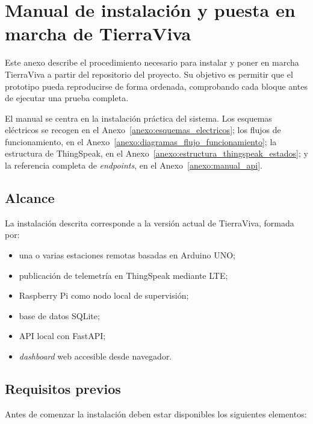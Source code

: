 \chapter{Manual de instalación y puesta en marcha de TierraViva}
\label{anexo:manual_instalacion_sistema}

Este anexo describe el procedimiento necesario para instalar y poner en marcha TierraViva a partir del repositorio del proyecto. Su objetivo es permitir que el prototipo pueda reproducirse de forma ordenada, comprobando cada bloque antes de ejecutar una prueba completa.

El manual se centra en la instalación práctica del sistema. Los esquemas eléctricos se recogen en el Anexo~\ref{anexo:esquemas_electricos}; los flujos de funcionamiento, en el Anexo~\ref{anexo:diagramas_flujo_funcionamiento}; la estructura de ThingSpeak, en el Anexo~\ref{anexo:estructura_thingspeak_estados}; y la referencia completa de \textit{endpoints}, en el Anexo~\ref{anexo:manual_api}.

\section{Alcance}

La instalación descrita corresponde a la versión actual de TierraViva, formada por:

\begin{itemize}
    \item una o varias estaciones remotas basadas en Arduino UNO;
    \item publicación de telemetría en ThingSpeak mediante LTE;
    \item Raspberry Pi como nodo local de supervisión;
    \item base de datos SQLite;
    \item API local con FastAPI;
    \item \textit{dashboard} web accesible desde navegador.
\end{itemize}

\section{Requisitos previos}

Antes de comenzar la instalación deben estar disponibles los siguientes elementos:

